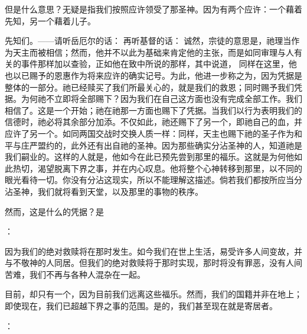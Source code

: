 但是什么意思？无疑是指我们按照应许领受了那圣神。因为有两个应许：一个藉着先知，另一个藉着儿子。\par

先知们。——请听岳厄尔的话： 再听基督的话： 诚然，宗徒的意思是，祂理当作为天主而被相信；然而，他并不以此为基础来肯定他的主张，而是如同审理与人有关的事件那样加以查验，正如他在致中所说的那样，其中说道， 同样在这里，他也以已赐予的恩惠作为将来应许的确实记号。为此，他进一步称之为，因为凭据是整体的一部分。祂已经赎买了我们所最关心的，就是我们的救恩；同时赐予我们凭据。为何祂不立即将全部赐下？因为我们在自己这方面也没有完成全部工作。我们相信了。这是一个开始；祂在祂那一方面也赐下了凭据。当我们以行为表明我们的信德时，祂必将其余部分加添。不仅如此，祂还赐下了另一个，即祂自己的血，并应许了另一个。如同两国交战时交换人质一样：同样，天主也赐下祂的圣子作为和平与庄严盟约的，此外还有出自祂的圣神。因为那些确实分沾圣神的人，知道祂是我们嗣业的。这样的人就是，他如今在此已预先尝到那里的福乐。这就是为何他如此热切，渴望脱离下界之事，并在内心叹息。他将整个心神转移到那里，以不同的眼光看待一切。你没有分沾这现实，所以不能理解这描述。倘若我们都按所应当分沾圣神，我们就将看到天堂，以及那里的事物的秩序。\par

然而，这是什么的凭据？是\par

：\par

因为我们的绝对救赎将在那时发生。如今我们在世上生活，易受许多人间变故，并与不敬神的人同居。但我们的绝对救赎将于那时实现，那时将没有罪恶，没有人间苦难，我们不再与各种人混杂在一起。\par

目前，却只有一个，因为目前我们远离这些福乐。然而，我们的国籍并非在地上；即使现在，我们已超越下界之事的范围。是的，我们甚至现在就是寄居者。\par

：\par

